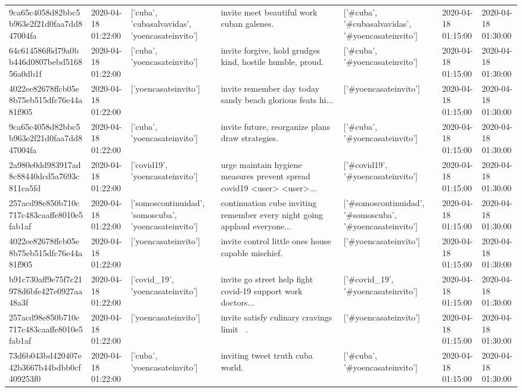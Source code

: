 \begin{tabular}{lllllll}
9ca65c4058d82bbc5b963e2f21d0faa7dd847004fa & 2020-04-18 01:22:00 & ['cuba', 'cubasalvavidas', 'yoencasateinvito'] & invite meet beautiful work cuban galenes. & ['#cuba', '#cubasalvavidas', '#yoencasateinvito'] & 2020-04-18 01:15:00 & 2020-04-18 01:30:00 \\
64c614586f6d79a0bb446d0807bebd516856a0db1f & 2020-04-18 01:22:00 & ['cuba', 'yoencasateinvito'] & invite forgive, hold grudges kind, hostile humble, proud. & ['#cuba', '#yoencasateinvito'] & 2020-04-18 01:15:00 & 2020-04-18 01:30:00 \\
4022ee82678ffcb05e8b75eb515dfc76e44a81f905 & 2020-04-18 01:22:00 & ['yoencasateinvito'] & invite remember day today sandy beach glorious feats hi... & ['#yoencasateinvito'] & 2020-04-18 01:15:00 & 2020-04-18 01:30:00 \\
9ca65c4058d82bbc5b963e2f21d0faa7dd847004fa & 2020-04-18 01:22:00 & ['cuba', 'yoencasateinvito'] & invite future, reorganize plans draw strategies. & ['#cuba', '#yoencasateinvito'] & 2020-04-18 01:15:00 & 2020-04-18 01:30:00 \\
2a980e0dd983917ad8c88440dcd5a7693c811ca5fd & 2020-04-18 01:22:00 & ['covid19', 'yoencasateinvito'] & urge maintain hygiene measures prevent spread covid19 <user> <user>... & ['#covid19', '#yoencasateinvito'] & 2020-04-18 01:15:00 & 2020-04-18 01:30:00 \\
257acd98e850b710c717c483caaffe8010e5fab1af & 2020-04-18 01:22:00 & ['somoscontinuidad', 'somoscuba', 'yoencasateinvito'] & continuation cube inviting remember every night going applaud everyone... & ['#somoscontinuidad', '#somoscuba', '#yoencasateinvito'] & 2020-04-18 01:15:00 & 2020-04-18 01:30:00 \\
4022ee82678ffcb05e8b75eb515dfc76e44a81f905 & 2020-04-18 01:22:00 & ['yoencasateinvito'] & invite control little ones house capable mischief. & ['#yoencasateinvito'] & 2020-04-18 01:15:00 & 2020-04-18 01:30:00 \\
b91c730aff9e75f7c21978d6bfe427e0927aa48a3f & 2020-04-18 01:22:00 & ['covid_19', 'yoencasateinvito'] & invite go street help fight covid-19 support work doctors... & ['#covid_19', '#yoencasateinvito'] & 2020-04-18 01:15:00 & 2020-04-18 01:30:00 \\
257acd98e850b710c717c483caaffe8010e5fab1af & 2020-04-18 01:22:00 & ['yoencasateinvito'] & invite satisfy culinary cravings limit 🤣🤣. & ['#yoencasateinvito'] & 2020-04-18 01:15:00 & 2020-04-18 01:30:00 \\
73d6b043bd420407e42b3667b44bdbb0cf409253f0 & 2020-04-18 01:22:00 & ['cuba', 'yoencasateinvito'] & inviting tweet truth cuba world. & ['#cuba', '#yoencasateinvito'] & 2020-04-18 01:15:00 & 2020-04-18 01:30:00 \\

\end{tabular}
